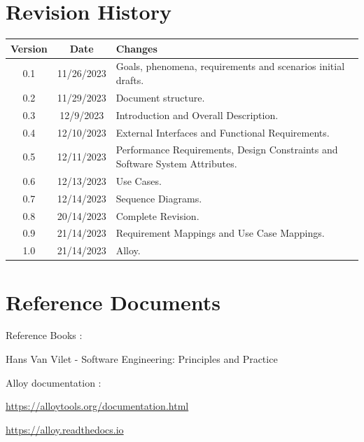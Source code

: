 \documentclass[11pt]{report}
\begin{document}
    \newpage
    \section{Revision History}
    \begin{center}
    \begin{tabular}{|c|c|p{9cm}|}
        \hline
        \rowcolor{gray!20}
        \textbf{Version} & \textbf{Date} & \textbf{Changes} \\
        \hline
        0.1 & 11/26/2023 & Goals, phenomena, requirements and scenarios initial drafts. \\
        \hline
        0.2 & 11/29/2023 & Document structure. \\
        \hline
        0.3 & 12/9/2023 & Introduction and Overall Description. \\
        \hline
        0.4 & 12/10/2023 & External Interfaces and Functional Requirements.  \\
        \hline
        0.5 & 12/11/2023 & Performance Requirements, Design Constraints and Software System Attributes. \\
        \hline
        0.6 & 12/13/2023 & Use Cases. \\
        \hline
        0.7 & 12/14/2023 & Sequence Diagrams. \\
        \hline
        0.8 & 20/14/2023 & Complete Revision. \\
        \hline
        0.9 & 21/14/2023 & Requirement Mappings and Use Case Mappings. \\
        \hline
        1.0 & 21/14/2023 & Alloy. \\
        \hline
    \end{tabular}
    \end{center}

    \section{Reference Documents}

    Reference Books : 

    Hans Van Vilet - Software Engineering: Principles and Practice

    \noindent Alloy documentation :     

    \url{https://alloytools.org/documentation.html}


    \url{https://alloy.readthedocs.io}
\end{document}
